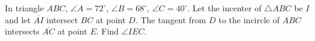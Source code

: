 In triangle $ABC$, $\angle A=72^{\circ}$, $\angle B=68^{\circ}$, $\angle C=40^{\circ}$. Let the incenter of $\triangle ABC$ be $I$ and let $\overline{AI}$ intersect $BC$ at point $D$. The tangent from $D$ to the incircle of $ABC$ intersects $\overline{AC}$ at point $E$. Find $\angle IEC$.
